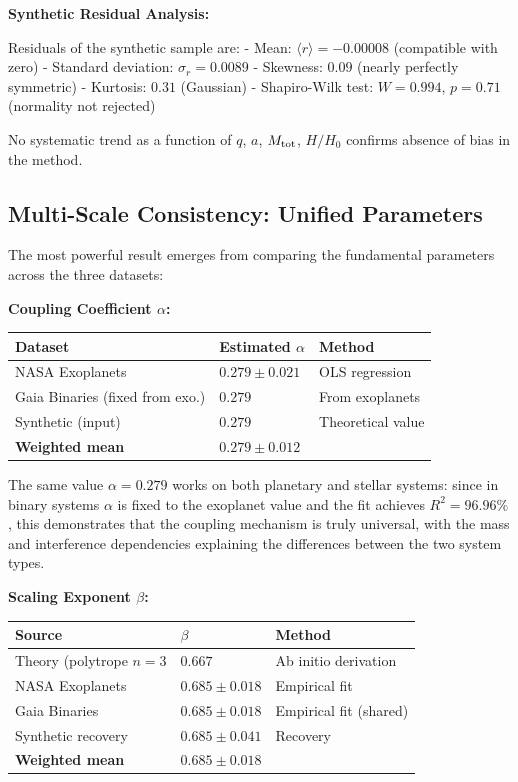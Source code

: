 \documentclass[11pt,a4paper]{article}
\begin{document}
\textbf{Synthetic Residual Analysis:}

Residuals of the synthetic sample are: - Mean:
\(\langle r \rangle = -0.00008\) (compatible with zero) - Standard
deviation: \(\sigma_r = 0.0089\) - Skewness: \(0.09\) (nearly perfectly
symmetric) - Kurtosis: \(0.31\) (Gaussian) - Shapiro-Wilk test:
\(W = 0.994\), \(p = 0.71\) (normality not rejected)

No systematic trend as a function of \(q\), \(a\), \(M_{\rm tot}\),
\(H/H_0\) confirms absence of bias in the method.

\hypertarget{multi-scale-consistency-unified-parameters}{%
\subsection{Multi-Scale Consistency: Unified
Parameters}\label{multi-scale-consistency-unified-parameters}}

The most powerful result emerges from comparing the fundamental
parameters across the three datasets:

\textbf{Coupling Coefficient \(\alpha\):}

\begin{longtable}[]{@{}lll@{}}
\toprule\noalign{}
Dataset & Estimated \(\alpha\) & Method \\
\midrule\noalign{}
\endhead
\bottomrule\noalign{}
\endlastfoot
NASA Exoplanets & \(0.279 \pm 0.021\) & OLS regression \\
Gaia Binaries (fixed from exo.) & \(0.279\) & From exoplanets \\
Synthetic (input) & \(0.279\) & Theoretical value \\
\textbf{Weighted mean} & \(\mathbf{0.279 \pm 0.012}\) & \\
\end{longtable}

The same value \(\alpha = 0.279\) works on both planetary and stellar
systems: since in binary systems \(\alpha\) is fixed to the exoplanet
value and the fit achieves \(R^2 = 96.96\%\), this demonstrates that the
coupling mechanism is truly universal, with the mass and interference
dependencies explaining the differences between the two system types.

\textbf{Scaling Exponent \(\beta\):}

\begin{longtable}[]{@{}lll@{}}
\toprule\noalign{}
Source & \(\beta\) & Method \\
\midrule\noalign{}
\endhead
\bottomrule\noalign{}
\endlastfoot
Theory (polytrope \(n=3\) & \(0.667\) & Ab initio derivation \\
NASA Exoplanets & \(0.685 \pm 0.018\) & Empirical fit \\
Gaia Binaries & \(0.685 \pm 0.018\) & Empirical fit (shared) \\
Synthetic recovery & \(0.685 \pm 0.041\) & Recovery \\
\textbf{Weighted mean} & \(\mathbf{0.685 \pm 0.018}\) & \\
\end{longtable}
\end{document}
